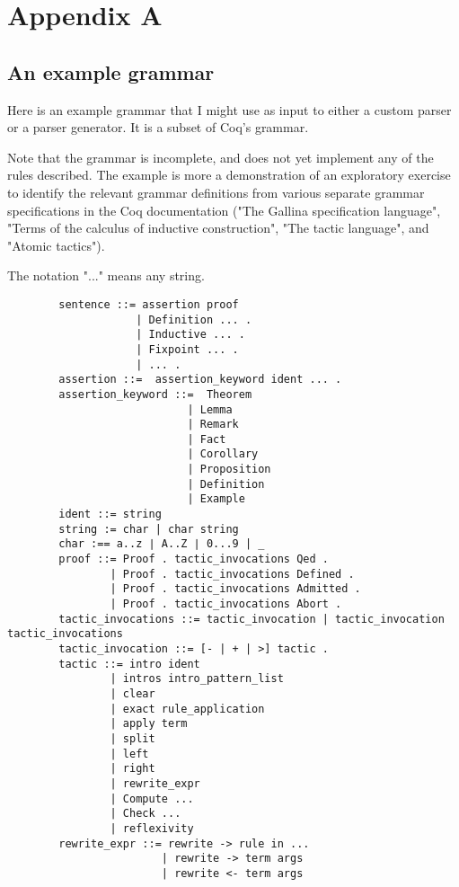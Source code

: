 \chapter{Appendix A} %

\label{AppendixA} %

\section{An example grammar}

Here is an example grammar that I might use as input to either a custom parser or a parser generator. It is a subset of Coq's grammar. 

Note that the grammar is incomplete, and does not yet implement any of the rules described. The example is more a demonstration of an exploratory exercise to identify the relevant grammar definitions from various separate grammar specifications in the Coq documentation ("The Gallina specification language", "Terms of the calculus of inductive construction", "The tactic language", and "Atomic tactics").

The notation "..." means any string. 


\begin{verbatim}
        sentence ::= assertion proof 
                    | Definition ... . 
                    | Inductive ... . 
                    | Fixpoint ... . 
                    | ... .
        assertion ::=  assertion_keyword ident ... .
        assertion_keyword ::=  Theorem 
                            | Lemma 
                            | Remark 
                            | Fact 
                            | Corollary 
                            | Proposition 
                            | Definition 
                            | Example
        ident ::= string
        string := char | char string
        char :== a..z ∣ A..Z ∣ 0...9 | _
        proof ::= Proof . tactic_invocations Qed . 
                | Proof . tactic_invocations Defined . 
                | Proof . tactic_invocations Admitted .
                | Proof . tactic_invocations Abort .
        tactic_invocations ::= tactic_invocation | tactic_invocation tactic_invocations
        tactic_invocation ::= [- | + | >] tactic .
        tactic ::= intro ident 
                | intros intro_pattern_list 
                | clear
                | exact rule_application 
                | apply term 
                | split 
                | left 
                | right 
                | rewrite_expr
                | Compute ...
                | Check ...
                | reflexivity 
        rewrite_expr ::= rewrite -> rule in ...
                        | rewrite -> term args
                        | rewrite <- term args
                \end{verbatim}